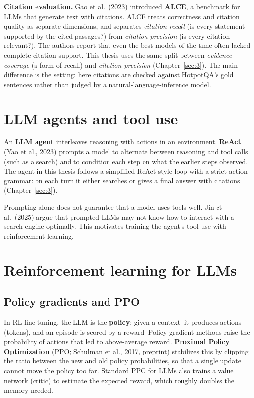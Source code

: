\textbf{Citation evaluation.} Gao et al.~(2023) introduced
\textbf{ALCE}, a benchmark for LLMs that generate text with citations.
ALCE treats correctness and citation quality as separate dimensions, and
separates \emph{citation recall} (is every statement supported by the
cited passages?) from \emph{citation precision} (is every citation
relevant?). The authors report that even the best models of the time
often lacked complete citation support. This thesis uses the same split
between \emph{evidence coverage} (a form of recall) and \emph{citation
precision} (Chapter~\ref{sec:3}). The main difference is the setting:
here citations are checked against HotpotQA's gold sentences rather than
judged by a natural-language-inference model.

\section{LLM agents and tool use}\label{sec:2.4}

An \textbf{LLM agent} interleaves reasoning with actions in an
environment. \textbf{ReAct} (Yao et al., 2023) prompts a model to
alternate between reasoning and tool calls (such as a search) and to
condition each step on what the earlier steps observed. The agent in
this thesis follows a simplified ReAct-style loop with a strict action
grammar: on each turn it either searches or gives a final answer with
citations (Chapter~\ref{sec:3}).

Prompting alone does not guarantee that a model uses tools well. Jin et
al.~(2025) argue that prompted LLMs may not know how to interact with a
search engine optimally. This motivates training the agent's tool use
with reinforcement learning.

\section{Reinforcement learning for LLMs}\label{sec:2.5}

\subsection{Policy gradients and PPO}\label{sec:2.5.1}

In RL fine-tuning, the LLM is the \textbf{policy}: given a context, it
produces actions (tokens), and an episode is scored by a reward.
Policy-gradient methods raise the probability of actions that led to
above-average reward. \textbf{Proximal Policy Optimization} (PPO;
Schulman et al., 2017, preprint) stabilizes this by clipping the ratio
between the new and old policy probabilities, so that a single update
cannot move the policy too far. Standard PPO for LLMs also trains a
value network (critic) to estimate the expected reward, which roughly
doubles the memory needed.


